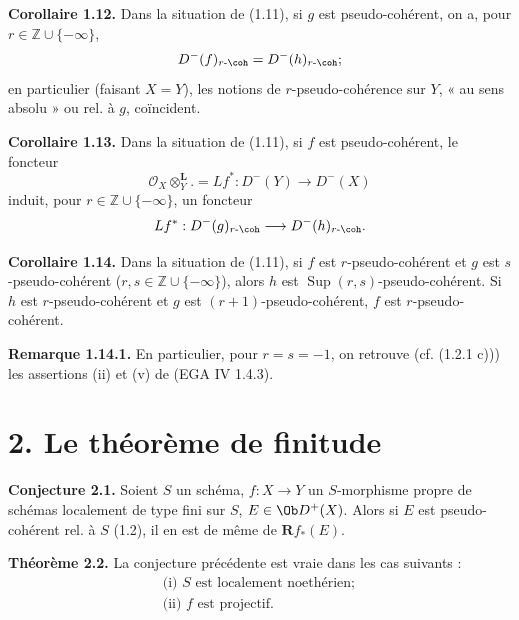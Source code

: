 \textbf{Corollaire 1.12.} Dans la situation de (1.11), si \(g\) est pseudo-cohérent, on a, pour \(r\in\mathbb Z\cup\{-\infty\}\),
\[
  D^{-}(f)_{r\text{-}\coh}=D^{-}(h)_{r\text{-}\coh};
\]
en particulier (faisant \(X=Y\)), les notions de \(r\)-pseudo-cohérence sur \(Y\), « au sens absolu » ou rel. à \(g\), coïncident.

\textbf{Corollaire 1.13.} Dans la situation de (1.11), si \(f\) est pseudo-cohérent, le foncteur
\[
  \mathcal O_X\otimes_Y^{\mathbf L}.=Lf^*:D^{-}(Y)\longrightarrow D^{-}(X)
\]
induit, pour \(r\in\mathbb Z\cup\{-\infty\}\), un foncteur
\[
  Lf^*:D^{-}(g)_{r\text{-}\coh}\longrightarrow D^{-}(h)_{r\text{-}\coh}.
\]

\textbf{Corollaire 1.14.} Dans la situation de (1.11), si \(f\) est \(r\)-pseudo-cohérent et \(g\) est \(s\)-pseudo-cohérent (\(r,s\in\mathbb Z\cup\{-\infty\}\)), alors \(h\) est \(\operatorname{Sup}(r,s)\)-pseudo-cohérent. Si \(h\) est \(r\)-pseudo-cohérent et \(g\) est \((r+1)\)-pseudo-cohérent, \(f\) est \(r\)-pseudo-cohérent.

\textbf{Remarque 1.14.1.} En particulier, pour \(r=s=-1\), on retrouve (cf. (1.2.1 c))) les assertions (ii) et (v) de (EGA IV 1.4.3).

\section*{2. Le théorème de finitude}

\textbf{Conjecture 2.1.} Soient \(S\) un schéma, \(f:X\to Y\) un \(S\)-morphisme propre de schémas localement de type fini sur \(S\), \(E\in\Ob D^+(X)\). Alors si \(E\) est pseudo-cohérent rel. à \(S\) (1.2), il en est de même de \(\mathbf Rf_*(E)\).

\textbf{Théorème 2.2.} La conjecture précédente est vraie dans les cas suivants :
\[
\begin{gathered}
  \text{(i) } S\text{ est localement noethérien};\\
  \text{(ii) } f\text{ est projectif}.
\end{gathered}
\]

